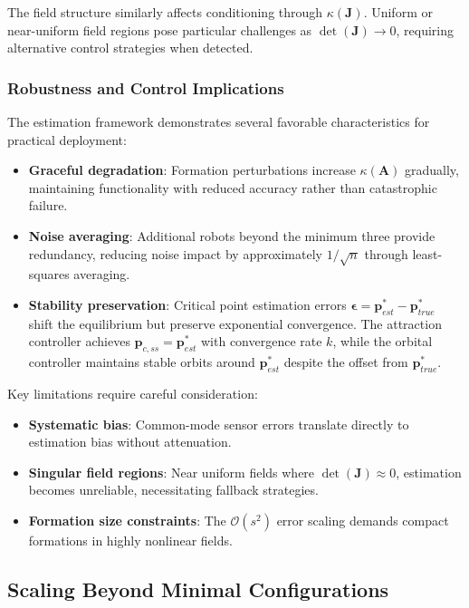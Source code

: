 \documentclass[lettersize,journal]{IEEEtran}
\begin{document}
The field structure similarly affects conditioning through $\kappa(\mathbf{J})$. Uniform or near-uniform field regions pose particular challenges as $\det(\mathbf{J}) \to 0$, requiring alternative control strategies when detected.

\subsubsection{Robustness and Control Implications}

The estimation framework demonstrates several favorable characteristics for practical deployment:

\begin{itemize}
\item \textbf{Graceful degradation}: Formation perturbations increase $\kappa(\mathbf{A})$ gradually, maintaining functionality with reduced accuracy rather than catastrophic failure.
\item \textbf{Noise averaging}: Additional robots beyond the minimum three provide redundancy, reducing noise impact by approximately $1/\sqrt{n}$ through least-squares averaging.
\item \textbf{Stability preservation}: Critical point estimation errors $\boldsymbol{\epsilon} = \mathbf{p}^*_{est} - \mathbf{p}^*_{true}$ shift the equilibrium but preserve exponential convergence. The attraction controller achieves $\mathbf{p}_{c,ss} = \mathbf{p}^*_{est}$ with convergence rate $k$, while the orbital controller maintains stable orbits around $\mathbf{p}^*_{est}$ despite the offset from $\mathbf{p}^*_{true}$.
\end{itemize}

Key limitations require careful consideration:

\begin{itemize}
\item \textbf{Systematic bias}: Common-mode sensor errors translate directly to estimation bias without attenuation.
\item \textbf{Singular field regions}: Near uniform fields where $\det(\mathbf{J}) \approx 0$, estimation becomes unreliable, necessitating fallback strategies.
\item \textbf{Formation size constraints}: The $\mathcal{O}(s^2)$ error scaling demands compact formations in highly nonlinear fields.
\end{itemize}

\subsection{Scaling Beyond Minimal Configurations}
\end{document}
